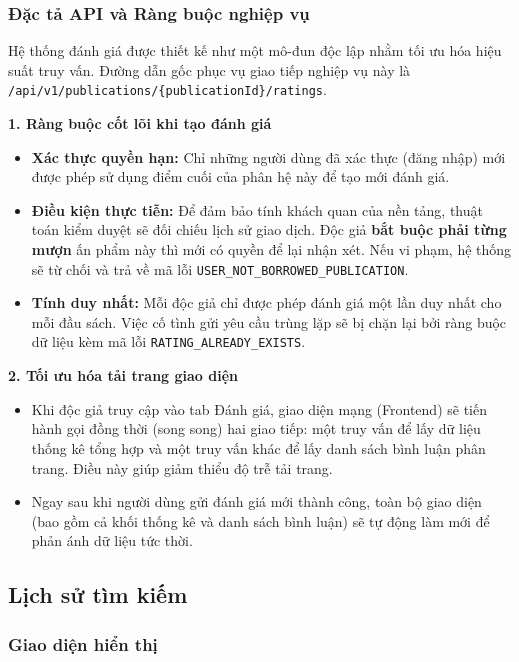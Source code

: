 \vspace{0.5cm}
\subsubsection{Đặc tả API và Ràng buộc nghiệp vụ}

Hệ thống đánh giá được thiết kế như một mô-đun độc lập nhằm tối ưu hóa hiệu suất truy vấn. Đường dẫn gốc phục vụ giao tiếp nghiệp vụ này là \texttt{/api/v1/publications/\{publicationId\}/ratings}.

\noindent\textbf{1. Ràng buộc cốt lõi khi tạo đánh giá}
\begin{itemize}
    \item \textbf{Xác thực quyền hạn:} Chỉ những người dùng đã xác thực (đăng nhập) mới được phép sử dụng điểm cuối của phân hệ này để tạo mới đánh giá.
    \item \textbf{Điều kiện thực tiễn:} Để đảm bảo tính khách quan của nền tảng, thuật toán kiểm duyệt sẽ đối chiếu lịch sử giao dịch. Độc giả \textbf{bắt buộc phải từng mượn} ấn phẩm này thì mới có quyền để lại nhận xét. Nếu vi phạm, hệ thống sẽ từ chối và trả về mã lỗi \texttt{USER\_NOT\_BORROWED\_PUBLICATION}.
    \item \textbf{Tính duy nhất:} Mỗi độc giả chỉ được phép đánh giá một lần duy nhất cho mỗi đầu sách. Việc cố tình gửi yêu cầu trùng lặp sẽ bị chặn lại bởi ràng buộc dữ liệu kèm mã lỗi \texttt{RATING\_ALREADY\_EXISTS}.
\end{itemize}

\noindent\textbf{2. Tối ưu hóa tải trang giao diện}
\begin{itemize}
    \item Khi độc giả truy cập vào tab Đánh giá, giao diện mạng (Frontend) sẽ tiến hành gọi đồng thời (song song) hai giao tiếp: một truy vấn để lấy dữ liệu thống kê tổng hợp và một truy vấn khác để lấy danh sách bình luận phân trang. Điều này giúp giảm thiểu độ trễ tải trang.
    \item Ngay sau khi người dùng gửi đánh giá mới thành công, toàn bộ giao diện (bao gồm cả khối thống kê và danh sách bình luận) sẽ tự động làm mới để phản ánh dữ liệu tức thời.
\end{itemize}

\subsection{Lịch sử tìm kiếm}

\subsubsection{Giao diện hiển thị}

